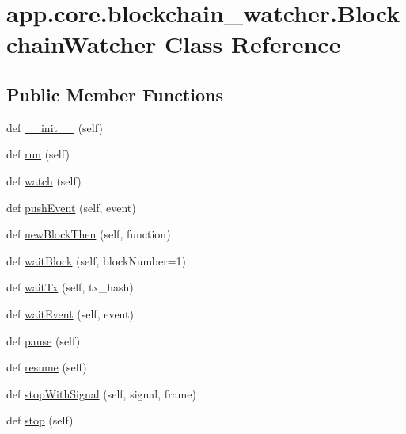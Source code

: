 \hypertarget{classapp_1_1core_1_1blockchain__watcher_1_1_blockchain_watcher}{}\section{app.\+core.\+blockchain\+\_\+watcher.\+Blockchain\+Watcher Class Reference}
\label{classapp_1_1core_1_1blockchain__watcher_1_1_blockchain_watcher}
\subsection*{Public Member Functions}
\begin{DoxyCompactItemize}
\item 
def \hyperlink{classapp_1_1core_1_1blockchain__watcher_1_1_blockchain_watcher_a49c89ab962a87230ac53f21d1bf7fe42}{\+\_\+\+\_\+init\+\_\+\+\_\+} (self)
\item 
def \hyperlink{classapp_1_1core_1_1blockchain__watcher_1_1_blockchain_watcher_a91c1a75611393e857f79ea5125e4e182}{run} (self)
\item 
def \hyperlink{classapp_1_1core_1_1blockchain__watcher_1_1_blockchain_watcher_af61c2c7866ec479d80b5fa6c649fc2ad}{watch} (self)
\item 
def \hyperlink{classapp_1_1core_1_1blockchain__watcher_1_1_blockchain_watcher_a35b92106fbfc7887e97e7c7dcb070c7e}{push\+Event} (self, event)
\item 
def \hyperlink{classapp_1_1core_1_1blockchain__watcher_1_1_blockchain_watcher_ad4605f13f621b889e271eb1e7a94810b}{new\+Block\+Then} (self, function)
\item 
def \hyperlink{classapp_1_1core_1_1blockchain__watcher_1_1_blockchain_watcher_a9de32860b621c9812acca90da840eb2d}{wait\+Block} (self, block\+Number=1)
\item 
def \hyperlink{classapp_1_1core_1_1blockchain__watcher_1_1_blockchain_watcher_a512a645e5cd62f93edb45222c8e531be}{wait\+Tx} (self, tx\+\_\+hash)
\item 
def \hyperlink{classapp_1_1core_1_1blockchain__watcher_1_1_blockchain_watcher_a0f4b9c5aa78bb78233a6528d80f8ffd4}{wait\+Event} (self, event)
\item 
def \hyperlink{classapp_1_1core_1_1blockchain__watcher_1_1_blockchain_watcher_a4a3aaafa9320893f7f530ecbd8c622f6}{pause} (self)
\item 
def \hyperlink{classapp_1_1core_1_1blockchain__watcher_1_1_blockchain_watcher_a86bf292f6c15d634ba31825fae29a6e2}{resume} (self)
\item 
def \hyperlink{classapp_1_1core_1_1blockchain__watcher_1_1_blockchain_watcher_ace48b275bb55841b3c6a116e6d2fde6a}{stop\+With\+Signal} (self, signal, frame)
\item 
def \hyperlink{classapp_1_1core_1_1blockchain__watcher_1_1_blockchain_watcher_a0b433e2749b4ab3768e43435aeb07bd8}{stop} (self)
\end{DoxyCompactItemize}
